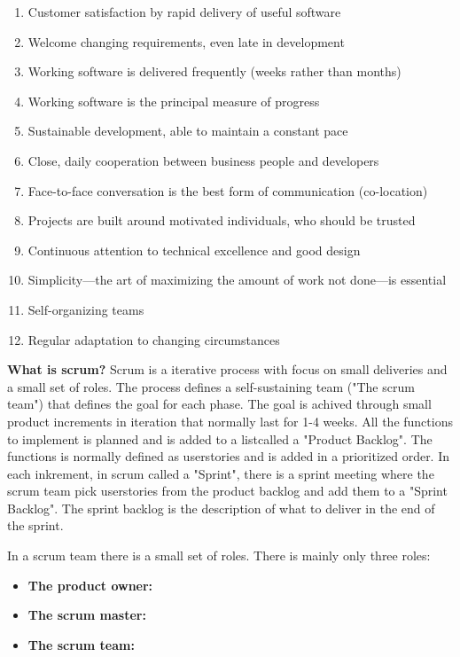 \begin{enumerate}
    \item Customer satisfaction by rapid delivery of useful software
    \item Welcome changing requirements, even late in development
    \item Working software is delivered frequently (weeks rather than months)
    \item Working software is the principal measure of progress
    \item Sustainable development, able to maintain a constant pace
    \item Close, daily cooperation between business people and developers
    \item Face-to-face conversation is the best form of communication (co-location)
    \item Projects are built around motivated individuals, who should be trusted
    \item Continuous attention to technical excellence and good design
    \item Simplicity—the art of maximizing the amount of work not done—is essential
    \item Self-organizing teams
    \item Regular adaptation to changing circumstances
\end{enumerate}


{\bf What is scrum? } Scrum is a iterative process with focus on small deliveries and a small set of roles. 
The process defines a self-sustaining team ("The scrum team") that defines the goal for each phase. The goal 
is achived through small product increments in iteration that normally last for 1-4 weeks. 
All the functions to implement is planned and is added to a listcalled a "Product Backlog". The
functions is normally defined as userstories and is added in a prioritized order. In each inkrement, 
in scrum called a "Sprint", there is a sprint meeting where the scrum team pick userstories from the 
product backlog and add them to a "Sprint Backlog". The sprint backlog is the description of what 
to deliver in the end of the sprint.

In a scrum team there is a small set of roles. There is mainly only three roles: 
\begin{itemize}
    \item {\bf The product owner: }
    \item {\bf The scrum master: }
    \item {\bf The scrum team: }
\end{itemize}

